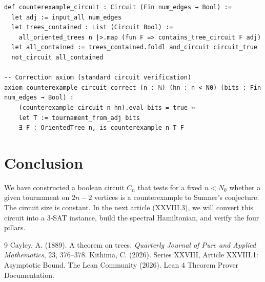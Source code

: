 \documentclass[11pt,a4paper]{article}
\begin{document}
\begin{lstlisting}[style=lean, caption={SeriesXXVIII/SumnerCircuit.lean (final)}]
def counterexample_circuit : Circuit (Fin num_edges → Bool) :=
  let adj := input_all num_edges
  let trees_contained : List (Circuit Bool) :=
    all_oriented_trees n |>.map (fun F => contains_tree_circuit F adj)
  let all_contained := trees_contained.foldl and_circuit circuit_true
  not_circuit all_contained

-- Correction axiom (standard circuit verification)
axiom counterexample_circuit_correct (n : ℕ) (hn : n < N0) (bits : Fin num_edges → Bool) :
    (counterexample_circuit n hn).eval bits = true ↔
    let T := tournament_from_adj bits
    ∃ F : OrientedTree n, is_counterexample n T F
\end{lstlisting}

\section{Conclusion}
We have constructed a boolean circuit $C_n$ that tests for a fixed $n < N_0$ whether a given tournament on $2n-2$ vertices is a counterexample to Sumner's conjecture. The circuit size is constant. In the next article (XXVIII.3), we will convert this circuit into a 3‑SAT instance, build the spectral Hamiltonian, and verify the four pillars.


\begin{thebibliography}{9}
  Cayley, A. (1889). A theorem on trees. \emph{Quarterly Journal of Pure and Applied Mathematics}, 23, 376–378.
  Kithima, C. (2026). Series XXVIII, Article XXVIII.1: Asymptotic Bound.
  The Lean Community (2026). Lean 4 Theorem Prover Documentation.
\end{thebibliography}
\end{document}
